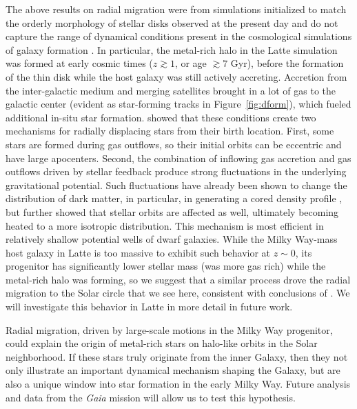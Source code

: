 \documentclass[apj, twocolappendix, numberedappendix, appendixfloats]{emulateapj}
\begin{document}
The above results on radial migration were from simulations initialized to match the orderly morphology of stellar disks observed at the present day and do not capture the range of dynamical conditions present in the cosmological simulations of galaxy formation \citep[e.g.,][]{agertz2009}.
In particular, the metal-rich halo in the Latte simulation was formed at early cosmic times ($z \gtrsim 1$, or age $\gtrsim 7$ Gyr), before the formation of the thin disk \citep{ma2016} while the host galaxy was still actively accreting.
Accretion from the inter-galactic medium and merging satellites brought in a lot of gas to the galactic center (evident as star-forming tracks in Figure~\ref{fig:dform}), which fueled additional in-situ star formation.
\citet{elbadry2016} showed that these conditions create two mechanisms for radially displacing stars from their birth location.
First, some stars are formed during gas outflows, so their initial orbits can be eccentric and have large apocenters.
Second, the combination of inflowing gas accretion and gas outflows driven by stellar feedback produce strong fluctuations in the underlying gravitational potential.
Such fluctuations have already been shown to change the distribution of dark matter, in particular, in generating a cored density profile \citep[e.g.,][]{pontzen2012, brooks2014, dicintio2014, chan:fire.dwarf.cusps}, but \citet{elbadry2016} further showed that stellar orbits are affected as well, ultimately becoming heated to a more isotropic distribution.
This mechanism is most efficient in relatively shallow potential wells of dwarf galaxies.
While the Milky Way-mass host galaxy in Latte is too massive to exhibit such behavior at $z \sim 0$, its progenitor has significantly lower stellar mass (was more gas rich) while the metal-rich halo was forming, so we suggest that a similar process drove the radial migration to the Solar circle that we see here, consistent with conclusions of \citet{ma2017}.
We will investigate this behavior in Latte in more detail in future work.

Radial migration, driven by large-scale motions in the Milky Way progenitor, could explain the origin of metal-rich stars on halo-like orbits in the Solar neighborhood.
If these stars truly originate from the inner Galaxy, then they not only illustrate an important dynamical mechanism shaping the Galaxy, but are also a unique window into star formation in the early Milky Way.
Future analysis and data from the \emph{Gaia} mission will allow us to test this hypothesis.
\end{document}
